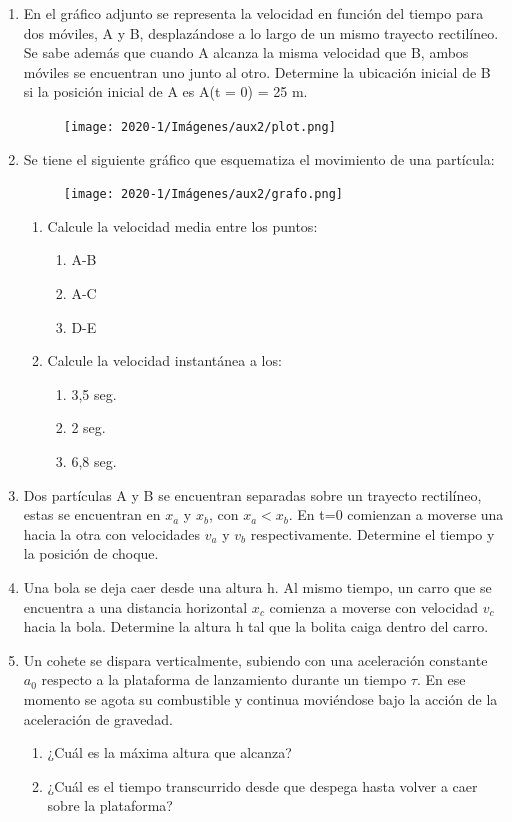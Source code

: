 \documentclass[letterpaper,11pt]{article}
\begin{document}
\begin{enumerate}
\item En el gráfico adjunto se representa la velocidad en función del tiempo para dos móviles, A y B, desplazándose a lo largo de un mismo trayecto rectilíneo. Se sabe además que cuando A alcanza la misma velocidad que B, ambos móviles se encuentran uno junto al otro. Determine la ubicación inicial de B si la posición inicial de A es A(t = 0) = 25 m.
    \begin{figure}[H]
        \centering
        \texttt{[image: 2020-1/Imágenes/aux2/plot.png]}
    \end{figure}
\item Se tiene el siguiente gráfico que esquematiza el movimiento de una partícula:
    \begin{figure}[H]
        \centering
        \texttt{[image: 2020-1/Imágenes/aux2/grafo.png]}
    \end{figure}

\begin{enumerate}
    \item Calcule la velocidad media entre los puntos:
        \begin{enumerate}
            \item A-B
            \item A-C
            \item D-E
        \end{enumerate}
    \item Calcule la velocidad instantánea a los:
        \begin{enumerate}
            \item 3,5 seg.
            \item 2 seg.
            \item 6,8 seg.
        \end{enumerate}
\end{enumerate}
 \item Dos partículas A y B se encuentran separadas sobre un trayecto rectilíneo, estas se encuentran en $x_a$ y $x_b$, con $x_a<x_b$. En t=0 comienzan a moverse una hacia la otra con velocidades $v_a$ y $v_b$ respectivamente. Determine el tiempo y la posición de choque. 

\item Una bola se deja caer desde una altura h. Al mismo tiempo, un carro que se encuentra a una distancia horizontal $x_c$ comienza a moverse con velocidad $v_c$ hacia la bola. 
Determine la altura h tal que la bolita caiga dentro del carro. 

\item Un cohete se dispara verticalmente, subiendo con una aceleración constante $a_0$ respecto a la plataforma de lanzamiento durante un tiempo $\tau$. En ese momento se agota su combustible y continua moviéndose bajo la acción de la aceleración de gravedad.
    \begin{enumerate}
        \item ¿Cuál es la máxima altura que alcanza?
        \item ¿Cuál es el tiempo transcurrido desde que despega hasta volver a caer sobre la plataforma?
    \end{enumerate}
    

\end{enumerate}
\end{document}
